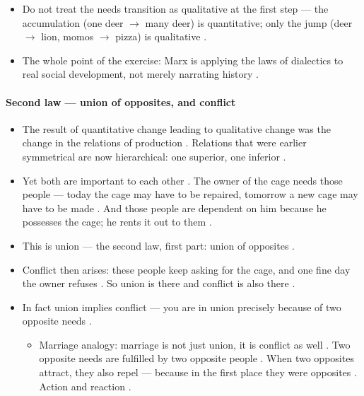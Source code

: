 \begin{CriticalPoint}
\begin{itemize}
    \item Do not treat the needs transition as qualitative at the first step --- the accumulation (one deer $\rightarrow$ many deer) is quantitative; only the jump (deer $\rightarrow$ lion, momos $\rightarrow$ pizza) is qualitative .
    \item The whole point of the exercise: Marx is applying the laws of dialectics to real social development, not merely narrating history .
\end{itemize}
\end{CriticalPoint}

\paragraph{Second law --- union of opposites, and conflict}
\begin{itemize}
    \item The result of quantitative change leading to qualitative change was the change in the relations of production . Relations that were earlier symmetrical are now hierarchical: one superior, one inferior .
    \item Yet both are important to each other . The owner of the cage needs those people --- today the cage may have to be repaired, tomorrow a new cage may have to be made . And those people are dependent on him because he possesses the cage; he rents it out to them .
    \item This is union --- the second law, first part: union of opposites .
    \item Conflict then arises: these people keep asking for the cage, and one fine day the owner refuses . So union is there and conflict is also there .
    \item In fact union implies conflict --- you are in union precisely because of two opposite needs .
    \begin{itemize}
        \item Marriage analogy: marriage is not just union, it is conflict as well . Two opposite needs are fulfilled by two opposite people . When two opposites attract, they also repel --- because in the first place they were opposites . Action and reaction .
    \end{itemize}
\end{itemize}

